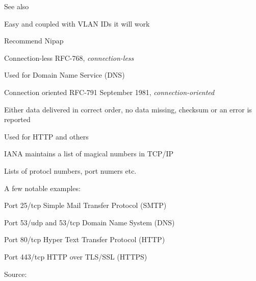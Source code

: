 \documentclass[Screen16to9,17pt]{foils}
\begin{document}
See also 




\centerline{Easy and coupled with VLAN IDs it will work \smiley}




\begin{list2}
\item Recommend Nipap 
\end{list2}



\begin{list1}
\item Connection-less RFC-768, \emph{connection-less}
\item Used for Domain Name Service (DNS)
\end{list1}


\begin{list1}
\item Connection oriented RFC-791 September 1981, \emph{connection-oriented}
\item Either data delivered in correct order, no data missing, checksum or an error is reported
\item Used for HTTP and others
\end{list1}




\begin{list1}
\item IANA maintains a list of magical numbers in TCP/IP
\item Lists of protocl numbers, port numers etc.
\item A few notable examples:
\begin{list2}
\item Port 25/tcp Simple Mail Transfer Protocol (SMTP)
\item Port 53/udp and 53/tcp Domain Name System (DNS)
\item Port 80/tcp Hyper Text Transfer Protocol (HTTP)
\item Port 443/tcp HTTP over TLS/SSL (HTTPS)
\end{list2}
\item Source: 
\end{list1}
\end{document}
